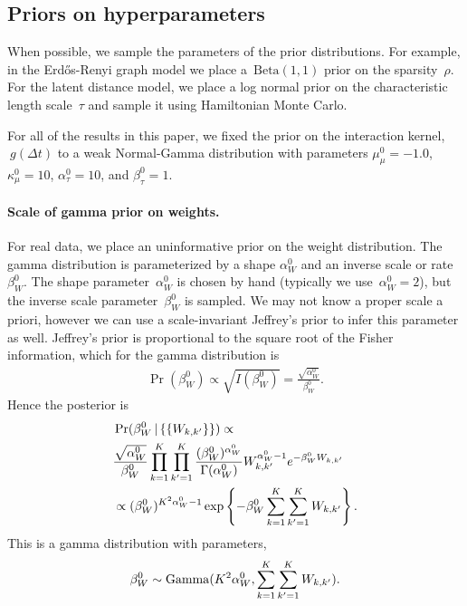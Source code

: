 \subsection{Priors on hyperparameters}
When possible, we sample the parameters of the prior distributions. For example, in the Erd\H{o}s-Renyi graph model we place a~${\mathrm{Beta}(1,1)}$ prior on the sparsity~$\rho$. For the latent distance model, we place a log normal prior on the characteristic length scale~${\tau}$ and sample it using Hamiltonian Monte Carlo. 

For all of the results in this paper, we fixed the prior on the interaction kernel,${~g(\Delta t)}$ to a weak Normal-Gamma distribution with parameters ${\mu_\mu^0=-1.0}$, ${\kappa_\mu^0=10}$, ${\alpha_\tau^0=10}$, and ${\beta_\tau^0=1}$.

\paragraph{Scale of gamma prior on weights.}
For real data, we place an uninformative prior on the weight distribution. The gamma distribution is parameterized by a shape $\alpha_W^0$ and an inverse scale or rate $\beta_W^{0}$. The shape parameter~${\alpha_W^0}$ is chosen by hand (typically we use~${\alpha_W^0=2}$), but the inverse scale parameter~${\beta_W^0}$ is sampled. We may not know a proper scale a priori, however we can use a scale-invariant Jeffrey's prior to infer this parameter as well. Jeffrey's prior is proportional to the square root of the Fisher information, which for the gamma distribution is
\begin{align*}
  \Pr(\beta_W^0) \propto \sqrt{I(\beta_W^0)} = \frac{\sqrt{\alpha_W^0}}{\beta_W^0}.
\end{align*}
Hence the posterior is 
\begin{align*}
&\Pr(\beta_W^0 \,|\, \{\{W_{k,k'}\}\} ) \propto \\
&\frac{\sqrt{\alpha_W^0}}{\beta_W^0}\prod_{k=1}^K\prod_{k'=1}^K \frac{(\beta_W^0)^{\alpha_W^0}}{\Gamma(\alpha_W^0)} W_{k,k'}^{\alpha_W^0-1}e^{-\beta_W^0 W_{k,k'}} \\
&\propto (\beta_W^0)^{K^2\alpha_W^0-1} \exp\left\{-\beta_W^0 \sum_{k=1}^{K}\sum_{k'=1}^K W_{k,k'}\right\}.
\end{align*}
This is a gamma distribution with parameters,
\begin{align*}
\beta_W^0\sim\mathrm{Gamma}(K^2\alpha_W^0,\sum_{k=1}^K\sum_{k'=1}^K W_{k,k'}).
\end{align*}


